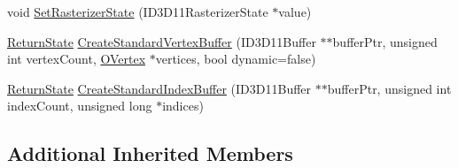 \begin{DoxyCompactItemize}
\item 
void \hyperlink{class_osiris_i_1_1_graphics_1_1_devices_1_1_direct3_d_device_a4417e05841299c1c7ea76e33b6616dd3}{Set\-Rasterizer\-State} (I\-D3\-D11\-Rasterizer\-State $\ast$value)
\item 
\hyperlink{namespace_osiris_i_a8f53bf938dc75c65c6a529694514013e}{Return\-State} \hyperlink{class_osiris_i_1_1_graphics_1_1_devices_1_1_direct3_d_device_add5ac509a1b9d037574e0f9c0a3d10c6}{Create\-Standard\-Vertex\-Buffer} (I\-D3\-D11\-Buffer $\ast$$\ast$buffer\-Ptr, unsigned int vertex\-Count, \hyperlink{struct_osiris_i_1_1_o_vertex}{O\-Vertex} $\ast$vertices, bool dynamic=false)
\item 
\hyperlink{namespace_osiris_i_a8f53bf938dc75c65c6a529694514013e}{Return\-State} \hyperlink{class_osiris_i_1_1_graphics_1_1_devices_1_1_direct3_d_device_a4beb397bc60ecae4a191b4143b0af0ea}{Create\-Standard\-Index\-Buffer} (I\-D3\-D11\-Buffer $\ast$$\ast$buffer\-Ptr, unsigned int index\-Count, unsigned long $\ast$indices)
\end{DoxyCompactItemize}
\subsection*{Additional Inherited Members}


